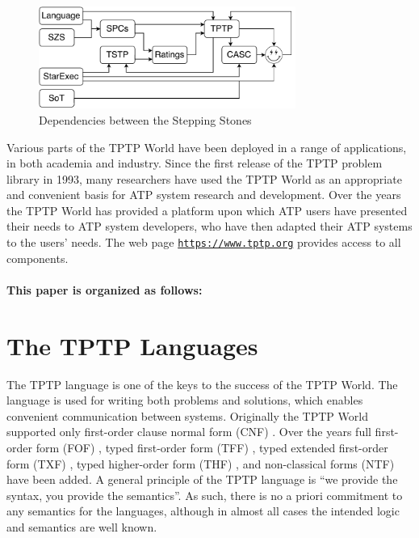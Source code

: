 \documentclass{easychair}
\newcommand{\smalltt}[1]{\small \texttt{#1}}
\begin{document}
\begin{figure}[htbp]
\centering
\includegraphics[width=0.75\textwidth]{Dependencies.pdf}
\caption{Dependencies between the Stepping Stones}
\label{Dependencies}
\end{figure}

Various parts of the TPTP World have been deployed in a range of applications, in both academia 
and industry.
Since the first release of the TPTP problem library in 1993, many researchers have used the 
TPTP World as an appropriate and convenient basis for ATP system research and development. 
Over the years the TPTP World has provided a platform upon which ATP users have presented their 
needs to ATP system developers, who have then adapted their ATP systems to the users’ needs.
The web page {\smalltt{\url{https://www.tptp.org}}} provides access to all components.

\paragraph{This paper is organized as follows:}

\section{The TPTP Languages}
\label{Languages}

The TPTP language \cite{Sut23-IGPL} is one of the keys to the success of the TPTP World.
The language is used for writing both problems and solutions,
which enables convenient communication between systems. 
Originally the TPTP World supported only first-order clause normal form (CNF)
\cite{SS98-JAR}.
Over the years full first-order form (FOF)
\cite{Sut09}, 
typed first-order form (TFF)
\cite{SS+12,BP13-TFF1}, 
typed extended first-order form (TXF)
\cite{SK18}, 
typed higher-order form (THF)
\cite{SB10,KSR16}, 
and non-classical forms (NTF) \cite{SF+22} have been added.
A general principle of the TPTP language is ``we provide the syntax, you provide the semantics''.
As such, there is no a priori commitment to any semantics for the languages, although in almost 
all cases the intended logic and semantics are well known.
\end{document}
